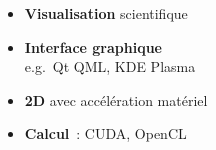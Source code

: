 \begin{frame}
\begin{columns}
\begin{column}{.4\textwidth}
\begin{itemize}
      \item \textbf{Visualisation} scientifique
      \item \textbf{Interface graphique} \\
        e.g.\ Qt QML, KDE Plasma
      \item \textbf{2D} avec accélération matériel
      \item \textbf{Calcul}~: CUDA, OpenCL
      \end{itemize}
    \end{column}
  \end{columns}
\end{frame}

